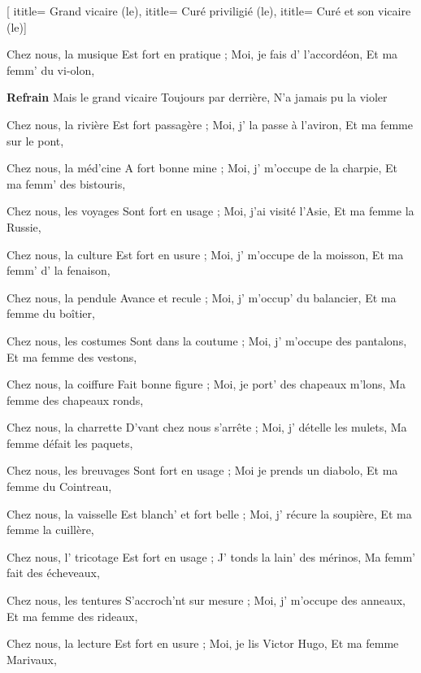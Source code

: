  [
ititle= {Grand vicaire (le)},
ititle= {Curé priviligié (le)},
ititle= {Curé et son vicaire (le)}]


\beginverse
Chez nous, la musique
Est fort en pratique ;
Moi, je fais d' l'accordéon,
Et ma femm' du vi-olon,
\endverse

\beginchorus
\textbf {Refrain}
Mais le grand vicaire
Toujours par derrière,
N'a jamais pu la violer
\endchorus

\beginverse
Chez nous, la rivière
Est fort passagère ;
Moi, j' la passe à l'aviron,
Et ma femme sur le pont,
\endverse

\beginverse
Chez nous, la méd'cine
A fort bonne mine ;
Moi, j' m'occupe de la charpie,
Et ma femm' des bistouris,
\endverse

\beginverse
Chez nous, les voyages
Sont fort en usage ;
Moi, j'ai visité l'Asie,
Et ma femme la Russie,
\endverse

\beginverse
Chez nous, la culture
Est fort en usure ;
Moi, j' m'occupe de la moisson,
Et ma femm' d' la fenaison,
\endverse

\beginverse
Chez nous, la pendule
Avance et recule ;
Moi, j' m'occup' du balancier,
Et ma femme du boîtier,
\endverse

\beginverse
Chez nous, les costumes
Sont dans la coutume ;
Moi, j' m'occupe des pantalons,
Et ma femme des vestons,
\endverse

\beginverse
Chez nous, la coiffure
Fait bonne figure ;
Moi, je port' des chapeaux m'lons,
Ma femme des chapeaux ronds,
\endverse

\beginverse
Chez nous, la charrette
D'vant chez nous s'arrête ;
Moi, j' dételle les mulets,
Ma femme défait les paquets,
\endverse

\beginverse
Chez nous, les breuvages
Sont fort en usage ;
Moi je prends un diabolo,
Et ma femme du Cointreau,
\endverse

\beginverse
Chez nous, la vaisselle
Est blanch' et fort belle ;
Moi, j' récure la soupière,
Et ma femme la cuillère,
\endverse

\beginverse
Chez nous, l' tricotage
Est fort en usage ;
J' tonds la lain' des mérinos,
Ma femm' fait des écheveaux,
\endverse

\beginverse
Chez nous, les tentures
S'accroch'nt sur mesure ;
Moi, j' m'occupe des anneaux,
Et ma femme des rideaux,
\endverse

\beginverse
Chez nous, la lecture
Est fort en usure ;
Moi, je lis Victor Hugo,
Et ma femme Marivaux,
\endverse

\endsong
